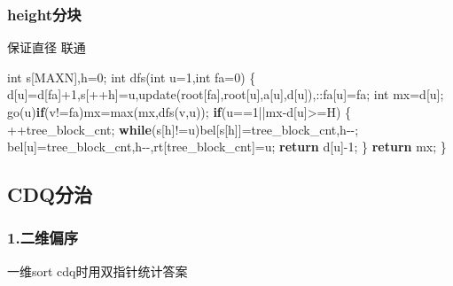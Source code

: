 \documentclass[
]{article}
\newenvironment{Shaded}{}{}
\newcommand{\ControlFlowTok}[1]{\textcolor[rgb]{0.00,0.44,0.13}{\textbf{#1}}}
\newcommand{\DataTypeTok}[1]{\textcolor[rgb]{0.56,0.13,0.00}{#1}}
\newcommand{\DecValTok}[1]{\textcolor[rgb]{0.25,0.63,0.44}{#1}}
\newcommand{\NormalTok}[1]{#1}
\begin{document}
\hypertarget{heightux5206ux5757}{%
\subsubsection{height分块}\label{heightux5206ux5757}}

保证直径 联通

\begin{Shaded}
\begin{Highlighting}[]
\DataTypeTok{int}\NormalTok{ s[MAXN],h=}\DecValTok{0}\NormalTok{;}
\DataTypeTok{int}\NormalTok{ dfs(}\DataTypeTok{int}\NormalTok{ u=}\DecValTok{1}\NormalTok{,}\DataTypeTok{int}\NormalTok{ fa=}\DecValTok{0}\NormalTok{)}
\NormalTok{\{}
\NormalTok{    d[u]=d[fa]+}\DecValTok{1}\NormalTok{,s[++h]=u,update(root[fa],root[u],a[u],d[u]),::fa[u]=fa;}
    \DataTypeTok{int}\NormalTok{ mx=d[u]; go(u)}\ControlFlowTok{if}\NormalTok{(v!=fa)mx=max(mx,dfs(v,u));}
    \ControlFlowTok{if}\NormalTok{(u==}\DecValTok{1}\NormalTok{||mx{-}d[u]\textgreater{}=H)}
\NormalTok{    \{}
\NormalTok{        ++tree\_block\_cnt;}
        \ControlFlowTok{while}\NormalTok{(s[h]!=u)bel[s[h]]=tree\_block\_cnt,h{-}{-};}
\NormalTok{        bel[u]=tree\_block\_cnt,h{-}{-},rt[tree\_block\_cnt]=u;}
        \ControlFlowTok{return}\NormalTok{ d[u]{-}}\DecValTok{1}\NormalTok{;}
\NormalTok{    \}}
    \ControlFlowTok{return}\NormalTok{ mx;}
\NormalTok{\}}
\end{Highlighting}
\end{Shaded}

\hypertarget{cdqux5206ux6cbb}{%
\subsection{CDQ分治}\label{cdqux5206ux6cbb}}

\hypertarget{ux4e8cux7ef4ux504fux5e8f}{%
\subsubsection{1.二维偏序}\label{ux4e8cux7ef4ux504fux5e8f}}

一维sort cdq时用双指针统计答案
\end{document}
